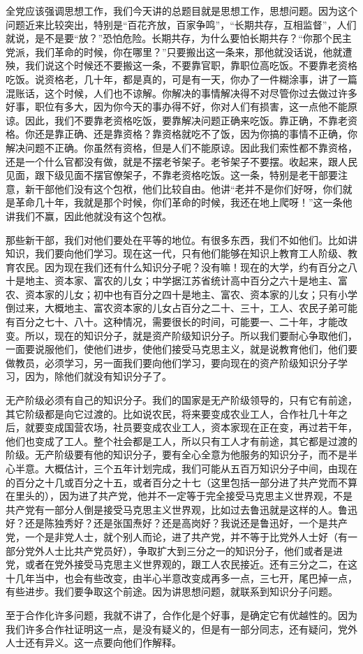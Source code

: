 全党应该强调思想工作，我们今天讲的总题目就是思想工作，思想问题。因为这个问题近来比较突出，特别是“百花齐放，百家争鸣”，“长期共存，互相监督”，人们就说，是不是要“放？”恐怕危险。长期共存，为什么要怕长期共存？“你那个民主党派，我们革命的时候，你在哪里？”只要搬出这一条来，那他就没话说，他就遭殃，我们说这个时候还不要搬这一条，不要靠官职，靠职位高吃饭。不要靠老资格吃饭。说资格老，几十年，都是真的，可是有一天，你办了一件糊涂事，讲了一篇混账话，这个时候，人们也不谅解。你解决的事情解决得不对尽管你过去做过许多好事，职位有多大，因为你今天的事办得不好，你对人们有损害，这一点他不能原谅。因此，我们不要靠老资格吃饭，要靠解决问题正确来吃饭。靠正确，不靠老资格。你还是靠正确、还是靠资格？靠资格就吃不了饭，因为你搞的事情不正确，你解决问题不正确。你虽然有资格，但是人们不能原谅。因此我们索性都不靠资格，还是一个什么官都没有做，就是不摆老爷架子。老爷架子不要摆。收起来，跟人民见面，跟下级见面不摆官僚架子，不靠老资格吃饭。这一条，特别是老干部要注意，新干部他们没有这个包袱，他们比较自由。他讲“老并不是你们好呀，你们就是革命几十年，我就是那个时候，你们革命的时候，我还在地上爬呀！”这一条他讲我们不赢，因此他就没有这个包袱。

那些新干部，我们对他们要处在平等的地位。有很多东西，我们不如他们。比如讲知识，我们要向他们学习。现在这一代，只有他们能够在知识上教育工人阶级、教育农民。因为现在我们还有什么知识分子呢？没有嘛！现在的大学，约有百分之八十是地主、资本家、富农的儿女；中学据江苏省统计高中百分之六十是地主、富农、资本家的儿女；初中也有百分之四十是地主、富农、资本家的儿女；只有小学倒过来，大概地主、富农资本家的儿女占百分之二十、三十，工人、农民子弟可能有百分之七十、八十。这种情况，需要很长的时间，可能要一、二十年，才能改变。所以，现在的知识分子，就是资产阶级知识分子。所以我们要耐心争取他们，一面要说服他们，使他们进步，使他们接受马克思主义，就是说教育他们，他们要做教员，必须学习，另一面我们要向他们学习，要向现在的资产阶级知识分子学习，因为，除他们就没有知识分子了。

无产阶级必须有自己的知识分子。我们的国家是无产阶级领导的，只有它有前途，其它阶级都是向它过渡的。比如说农民，将来要变成农业工人，合作社几十年之后，就要变成国营农场，社员要变成农业工人，资本家现在正在变，再过若干年，他们也变成了工人。整个社会都是工人，所以只有工人才有前途，其它都是过渡的阶级。无产阶级要有他的知识分子，要有全心全意为他服务的知识分子，而不是半心半意。大概估计，三个五年计划完成，我们可能从五百万知识分子中间，由现在的百分之十几或百分之十五，或者百分之十七（这里包括一部分进了共产党而不算在里头的），因为进了共产党，他并不一定等于完全接受马克思主义世界观，不是共产党有一部分人倒是接受马克思主义世界观，比如过去鲁迅就是这样的人。鲁迅好？还是陈独秀好？还是张国焘好？还是高岗好？我说还是鲁迅好，一个是共产党，一个是非党人士，就个别人而论，进了共产党，并不等于比党外人士好（有一部分党外人士比共产党员好），争取扩大到三分之一的知识分子，他们或者是进党，或者在党外接受马克思主义世界观的，跟工人农民接近。还有三分之二，在这十几年当中，也会有些改变，由半心半意改变成再多一点，三七开，尾巴掉一点，有些进步。我们要争取这个前途。因为讲思想问题，就联系到知识分子问题。

至于合作化许多问题，我就不讲了，合作化是个好事，是确定它有优越性的。因为我们许多合作社证明这一点，是没有疑义的，但是有一部分同志，还有疑问，党外人士还有异义。这一点要向他们作解释。


